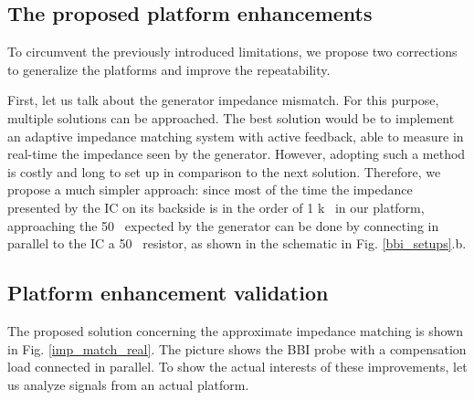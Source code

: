	\subsection{The proposed platform enhancements}
		To circumvent the previously introduced limitations, we propose two corrections to generalize the platforms and improve the repeatability.

		First, let us talk about the generator impedance mismatch.
		For this purpose, multiple solutions can be approached.
		The best solution would be to implement an adaptive impedance matching system with active feedback, able to measure in real-time the impedance seen by the generator.
		However, adopting such a method is costly and long to set up in comparison to the next solution.
		Therefore, we propose a much simpler approach: since most of the time the impedance presented by the IC on its backside is in the order of 1 k \textOmega\ in our platform, approaching the 50 \textOmega\ expected by the generator can be done by connecting in parallel to the IC a 50 \textOmega\ resistor, as shown in the schematic in Fig. \ref{bbi_setups}.b.

%

	\subsection{Platform enhancement validation}
		
		The proposed solution concerning the approximate impedance matching is shown in Fig. \ref{imp_match_real}.
		The picture shows the BBI probe with a compensation load connected in parallel.
		To show the actual interests of these improvements, let us analyze signals from an actual platform.

